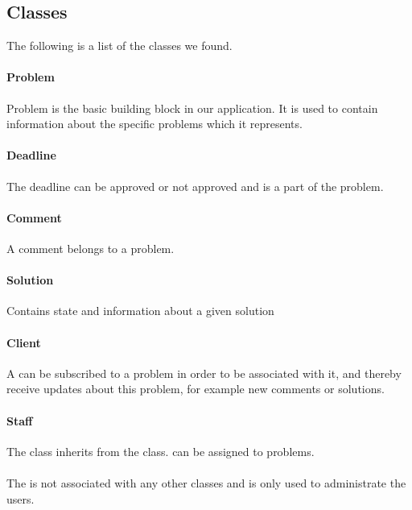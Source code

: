 \subsection{Classes}
\label{}
The following is a list of the classes we found.

\paragraph{Problem}
Problem is the basic building block in our application. It is used to contain information about the specific problems which it represents.

\paragraph{Deadline} The deadline can be approved or not approved and is a part of the problem. 

\paragraph{Comment} A comment belongs to a problem. 

\paragraph{Solution}
Contains state and information about a given solution


\paragraph{Client} A \aclient[] can be subscribed to a problem in order to be associated with it, and thereby receive updates about this problem, for example new comments or solutions.
 
\paragraph{Staff}
The \astaff[] class inherits from the \aclient[] class.
\astaff[] can be assigned to problems. 

\paragraph{\Admin[]} The \admin[] is not associated with any other classes and is only used to administrate the users. 


